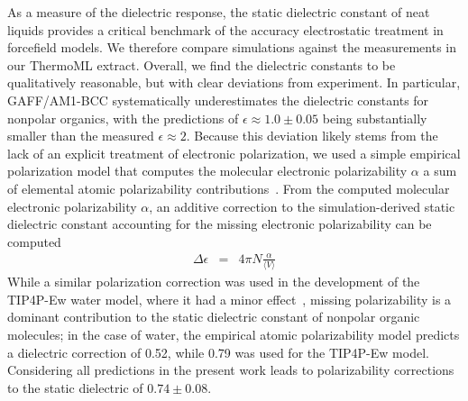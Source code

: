\documentclass[aps,pre,twocolumn,nofootinbib,superscriptaddress,linenumbers]{revtex4-1}
\begin{document}
As a measure of the dielectric response, the static dielectric constant of neat liquids provides a critical benchmark of the accuracy electrostatic treatment in forcefield models.  
We therefore compare simulations against the measurements in our ThermoML extract.  
Overall, we find the dielectric constants to be qualitatively reasonable, but with clear deviations from experiment.  
In particular, GAFF/AM1-BCC systematically underestimates the dielectric constants for nonpolar organics, with the predictions of $\epsilon \approx 1.0 \pm 0.05$ being substantially smaller than the measured $\epsilon \approx 2$.  
Because this deviation likely stems from the lack of an explicit treatment of electronic polarization, we used a simple empirical polarization model that computes the molecular electronic polarizability $\alpha$ a sum of elemental atomic polarizability contributions~\cite{bosque2002polarizabilities}.
From the computed molecular electronic polarizability $\alpha$, an additive correction to the simulation-derived static dielectric constant accounting for the missing electronic polarizability can be computed~\cite{horn2004}
\begin{eqnarray}
\Delta \epsilon &=& 4 \pi N  \frac{\alpha}{\langle V \rangle} \label{equation:dielectric correction}
\end{eqnarray}
While a similar polarization correction was used in the development of the TIP4P-Ew water model, where it had a minor effect~\cite{horn2004}, missing polarizability is a dominant contribution to the static dielectric constant of nonpolar organic molecules;   
in the case of water, the empirical atomic polarizability model predicts a dielectric correction of 0.52, while 0.79 was used for the TIP4P-Ew model.  
Considering all predictions in the present work leads to polarizability corrections to the static dielectric of $0.74 \pm 0.08$.
\end{document}
